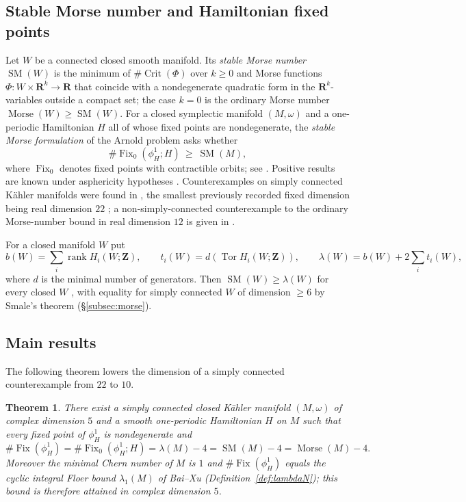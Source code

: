 \documentclass[11pt]{amsart}
\numberwithin{equation}{section}
\newtheorem{mainthm}{Theorem}
\theoremstyle{definition}
\theoremstyle{remark}
\newcommand{\Z}{\mathbf Z}
\newcommand{\R}{\mathbf R}
\DeclareMathOperator{\Tor}{Tor}
\DeclareMathOperator{\SM}{SM}
\DeclareMathOperator{\Morse}{Morse}
\DeclareMathOperator{\Crit}{Crit}
\DeclareMathOperator{\Fix}{Fix}
\DeclareMathOperator{\rank}{rank}
\begin{document}
\subsection{Stable Morse number and Hamiltonian fixed points}
Let $W$ be a connected closed smooth manifold. Its \emph{stable Morse
number} $\SM(W)$ is the minimum of $\#\Crit(\Phi)$ over $k\ge 0$ and Morse
functions $\Phi\colon W\times\R^k\to\R$ that coincide with a nondegenerate
quadratic form in the $\R^k$-variables outside a compact set; the case
$k=0$ is the ordinary Morse number $\Morse(W)\ge\SM(W)$. For a closed
symplectic manifold $(M,\omega)$ and a one-periodic Hamiltonian $H$ all of
whose fixed points are nondegenerate, the \emph{stable Morse formulation}
of the Arnold problem asks whether
\begin{equation}\label{eq:SMconj}
  \#\Fix_0(\phi_H^1;H)\ \ge\ \SM(M),
\end{equation}
where $\Fix_0$ denotes fixed points with contractible orbits; see
\cite[Conjecture~1.2]{Golovko2020}. Positive results are known under
asphericity hypotheses \cite{DRG2017}. Counterexamples on simply connected
K\"ahler manifolds were found in \cite{OpenAIStable,OpenAI22,OpenAICompanion},
the smallest previously recorded fixed dimension being real dimension $22$
\cite{OpenAI22}; a non-simply-connected counterexample to the ordinary
Morse-number bound in real dimension $12$ is given in \cite{OpenAISept23}.

For a closed manifold $W$ put
\[
  b(W)=\sum_i\rank H_i(W;\Z),\qquad t_i(W)=d(\Tor H_i(W;\Z)),\qquad
  \lambda(W)=b(W)+2\sum_i t_i(W),
\]
where $d$ is the minimal number of generators. Then $\SM(W)\ge\lambda(W)$
for every closed $W$ \cite[Prop.~2.2]{OpenAI22}, with equality for simply
connected $W$ of dimension $\ge 6$ by Smale's theorem
(\S\ref{subsec:morse}).

\subsection{Main results}
The following theorem lowers the dimension of a simply connected
counterexample from $22$ to $10$.

\begin{mainthm}\label{thmA}
There exist a simply connected closed K\"ahler manifold $(M,\omega)$ of
complex dimension $5$ and a smooth one-periodic Hamiltonian $H$ on $M$
such that every fixed point of $\phi_H^1$ is nondegenerate and
\[
  \#\Fix(\phi_H^1)=\#\Fix_0(\phi_H^1;H)=\lambda(M)-4=\SM(M)-4=\Morse(M)-4 .
\]
Moreover the minimal Chern number of $M$ is $1$ and
$\#\Fix(\phi_H^1)$ equals the cyclic integral Floer bound
$\lambda_1(M)$ of Bai--Xu (Definition~\ref{def:lambdaN}); this bound is
therefore attained in complex dimension $5$.
\end{mainthm}
\end{document}
